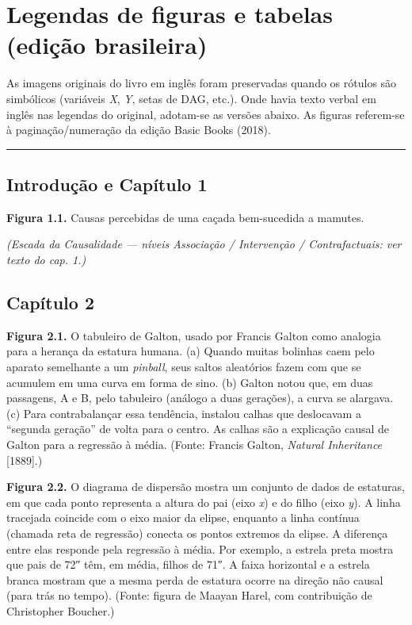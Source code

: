 \documentclass[11pt,a5paper,twoside]{book}
\begin{document}
\chapter{Legendas de figuras e tabelas (edição brasileira)}
As imagens originais do livro em inglês foram preservadas quando os rótulos são simbólicos (variáveis \textit{X}, \textit{Y}, setas de DAG, etc.). Onde havia texto verbal em inglês nas legendas do original, adotam-se as versões abaixo. As figuras referem-se à paginação/numeração da edição Basic Books (2018).

\vspace{1em}\hrule\vspace{1em}
\section{Introdução e Capítulo 1}
\textbf{Figura 1.1.} Causas percebidas de uma caçada bem-sucedida a mamutes.

\textit{(Escada da Causalidade — níveis Associação / Intervenção / Contrafactuais: ver texto do cap. 1.)}

\section{Capítulo 2}
\textbf{Figura 2.1.} O tabuleiro de Galton, usado por Francis Galton como analogia para a herança da estatura humana. (a) Quando muitas bolinhas caem pelo aparato semelhante a um \textit{pinball}, seus saltos aleatórios fazem com que se acumulem em uma curva em forma de sino. (b) Galton notou que, em duas passagens, A e B, pelo tabuleiro (análogo a duas gerações), a curva se alargava. (c) Para contrabalançar essa tendência, instalou calhas que deslocavam a “segunda geração” de volta para o centro. As calhas são a explicação causal de Galton para a regressão à média. (Fonte: Francis Galton, \textit{Natural Inheritance} [1889].)

\textbf{Figura 2.2.} O diagrama de dispersão mostra um conjunto de dados de estaturas, em que cada ponto representa a altura do pai (eixo \textit{x}) e do filho (eixo \textit{y}). A linha tracejada coincide com o eixo maior da elipse, enquanto a linha contínua (chamada reta de regressão) conecta os pontos extremos da elipse. A diferença entre elas responde pela regressão à média. Por exemplo, a estrela preta mostra que pais de 72″ têm, em média, filhos de 71″. A faixa horizontal e a estrela branca mostram que a mesma perda de estatura ocorre na direção não causal (para trás no tempo). (Fonte: figura de Maayan Harel, com contribuição de Christopher Boucher.)
\end{document}
